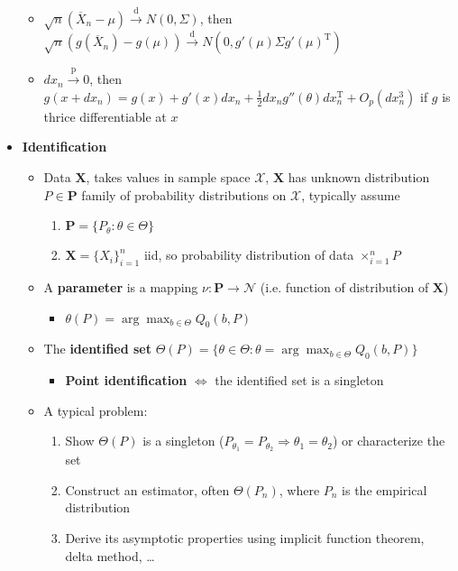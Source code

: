 \documentclass[12pt,english]{article}
\newcommand{\T}{\ensuremath{\text{T}}}
\begin{document}
\begin{itemize}
	\begin{itemize}
		\item $\sqrt{n} (\overline{X}_{n} - \mu) \overset{\text{d}}{\to} N(0, \Sigma)$, then $\sqrt{n} (g(\overline{X}_{n}) - g(\mu)) \overset{\text{d}}{\to} N(0, g'(\mu) \Sigma g'(\mu)^{\T})$ 
		\item $dx_{n} \overset{\text{p}}{\to} 0$, then $g(x + dx_{n}) = g(x) + g'(x) dx_{n} + \frac{1}{2} dx_{n} g''(\theta) dx_{n}^{\T} + O_{p}(dx_{n}^{3})$ if $g$ is thrice differentiable at $x$
	\end{itemize}
	\item \textbf{Identification}
	\begin{itemize}
		\item Data $\textbf{X}$, takes values in sample space $\mathcal{X}$, $\textbf{X}$ has unknown distribution $P \in \textbf{P}$ family of probability distributions on $\mathcal{X}$, typically assume
		\begin{enumerate}
			\item $\textbf{P} = \{ P_{\theta} : \theta \in \Theta \}$
			\item $\textbf{X} = \{ X_{i} \}_{i=1}^{n}$ iid, so probability distribution of data $\times_{i=1}^{n} P$
		\end{enumerate}
		\item A \textbf{parameter} is a mapping $\nu : \mathbf{P} \to \mathcal{N}$ (i.e. function of distribution of $\textbf{X}$)
		\begin{itemize}
			\item $\displaystyle\theta(P) = \arg \max_{b \in \Theta} Q_{0}(b, P)$
		\end{itemize}
		\item The \textbf{identified set} $\displaystyle\Theta(P) = \{ \theta \in \Theta : \theta = \arg \max_{b \in \Theta} Q_{0}(b, P) \}$
		\begin{itemize}
			\item \textbf{Point identification} $\Leftrightarrow$ the identified set is a singleton
		\end{itemize}
		\item A typical problem:
		\begin{enumerate}
			\item Show $\Theta(P)$ is a singleton ($P_{\theta_{1}} = P_{\theta_{2}} \Rightarrow \theta_{1} = \theta_{2}$) or characterize the set
			\item Construct an estimator, often $\Theta(P_{n})$, where $P_{n}$ is the empirical distribution
			\item Derive its asymptotic properties using implicit function theorem, delta method, \ldots
		\end{enumerate}
	\end{itemize}
\end{itemize}
\end{document}
